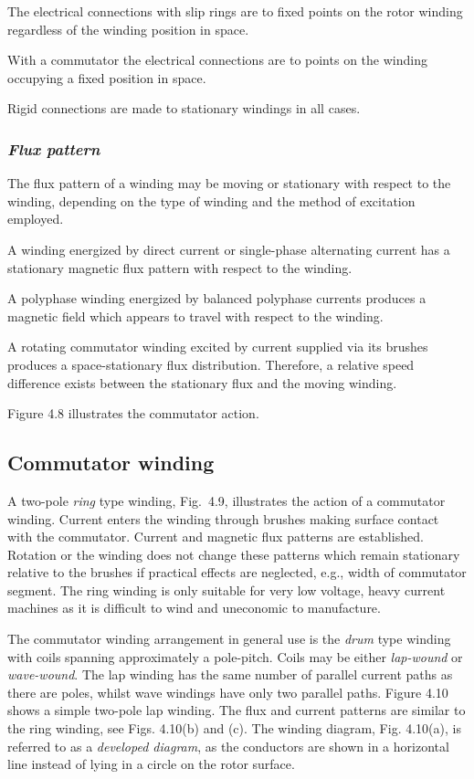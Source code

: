 \documentclass[a4paper,numbers=noenddot,12pt]{scrbook}
\begin{document}
The electrical connections with slip rings are to fixed points on the rotor winding regardless of the winding position in space.

With a commutator the electrical connections are to points on the winding occupying a fixed position in space.

Rigid connections are made to stationary windings in all cases.

\subsubsection{\textit{Flux pattern}}
The flux pattern of a winding may be moving or stationary with respect to the winding, depending on the type of winding and the method of excitation employed. 

A winding energized by direct current or single-phase alternating current has a stationary magnetic flux pattern with respect to the winding.

A polyphase winding energized by balanced polyphase currents produces a magnetic field which appears to travel with respect to the winding.

A rotating commutator winding excited by current supplied via its brushes produces a space-stationary flux distribution. Therefore, a relative speed difference exists between the stationary flux and the moving winding.

Figure 4.8 illustrates the commutator action.

\subsection{Commutator winding}
A two-pole \textit{ring} type winding, Fig.\ 4.9, illustrates the action of a commutator winding. Current enters the winding through brushes making surface contact with the commutator. Current and magnetic flux patterns are established. Rotation or the winding does not change these patterns which remain stationary relative to the brushes if practical effects are neglected, e.g., width of commutator segment. The ring winding is only suitable for very low voltage,
heavy current machines as it is difficult to wind and uneconomic to manufacture.

The commutator winding arrangement in general use is the \textit{drum} type winding with coils spanning approximately a pole-pitch. Coils may be either \textit{lap-wound} or \textit{wave-wound}. The lap winding has the same number of parallel current paths as there are poles, whilst wave windings have only two parallel paths. Figure 4.10 shows a simple two-pole lap winding. The flux and current patterns are similar to the ring winding, see Figs. 4.10(b) and (c). The winding diagram, Fig.
4.10(a), is referred to as a \textit{developed diagram}, as the conductors are shown in a horizontal line instead of lying in a circle on the rotor surface.
\end{document}

